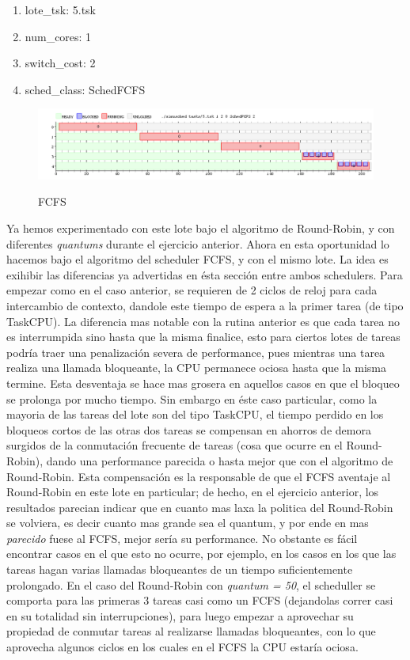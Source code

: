 \begin{enumerate}
	\item lote\_tsk: 5.tsk
	\item num\_cores: 1
	\item switch\_cost: 2
	\item sched\_class: SchedFCFS
\end{enumerate}

\begin{figure}[h]
    \includegraphics[width=\linewidth]{images/6_quantum2.png}
    \label{fig:Task Consola}
    \caption{FCFS}
\end{figure}

Ya hemos experimentado con este lote bajo el algoritmo de Round-Robin, y con diferentes \textit{quantums} durante el ejercicio anterior. Ahora en esta oportunidad lo hacemos bajo el algoritmo del scheduler FCFS, y con el mismo lote. La idea es exihibir las diferencias ya advertidas en ésta sección entre ambos schedulers. Para empezar como en el caso anterior, se requieren de 2 ciclos de reloj para cada intercambio de contexto, dandole este tiempo de espera a la primer tarea (de tipo TaskCPU). La diferencia mas notable con la rutina anterior es que cada tarea no es interrumpida sino hasta que la misma finalice, esto para ciertos lotes de tareas podría traer una penalización severa de performance, pues mientras una tarea realiza una llamada bloqueante, la CPU permanece ociosa hasta que la misma termine. Esta desventaja se hace mas grosera en aquellos casos en que el bloqueo se prolonga por mucho tiempo. Sin embargo en éste caso particular, como la mayoria de las tareas del lote son del tipo TaskCPU, el tiempo perdido en los bloqueos cortos de las otras dos tareas se compensan en ahorros de demora surgidos de la conmutación frecuente de tareas (cosa que ocurre en el Round-Robin), dando una performance parecida o hasta mejor que con el algoritmo de Round-Robin. Esta compensación es la responsable de que el FCFS aventaje al Round-Robin en este lote en particular; de hecho, en el ejercicio anterior, los resultados parecian indicar que en cuanto mas laxa la politica del Round-Robin se volviera, es decir cuanto mas grande sea el quantum, y por ende en mas \textit{parecido} fuese al FCFS, mejor sería su performance. No obstante es fácil encontrar casos en el que esto no ocurre, por ejemplo, en los casos en los que las tareas hagan varias llamadas bloqueantes de un tiempo suficientemente prolongado.
 En el caso del Round-Robin con \textit{quantum = 50}, el scheduller se comporta para las primeras 3 tareas casi como un FCFS (dejandolas correr casi en su totalidad sin interrupciones), para luego empezar a aprovechar su propiedad de conmutar tareas al realizarse llamadas bloqueantes, con lo que aprovecha algunos ciclos en los cuales en el FCFS la CPU estaría ociosa.